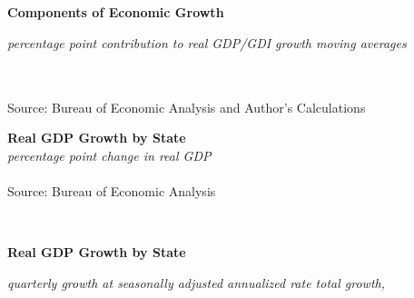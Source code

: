 \documentclass{report}
\begin{document}
\noindent \normalsize \textbf{Components of Economic Growth}\\
\footnotesize{\textit{percentage point contribution to real GDP/GDI growth \hspace{30mm} moving averages}\\ \vspace{4mm}
\hspace*{-2mm} \noindent {} \setlength{\tabcolsep}{3.5pt} \color{black!90}
		{\renewcommand{\arraystretch}{1.55}
		 \begin{tabular}{p{2mm} p{35.2mm} R{6.8mm} R{6.8mm} R{6.8mm} R{6.8mm} R{6.8mm} p{0mm} R{6.8mm} R{6.8mm} R{6.8mm} }

		\end{tabular}
		}	\\
\footnotesize{Source: Bureau of Economic Analysis and Author's Calculations}
		
\newpage

\noindent \normalsize \textbf{Real GDP Growth by State}\\
\footnotesize{\textit{percentage point change in real GDP}}\\
\vspace{-2mm}
\hspace{-8mm}  \\
\footnotesize{Source: Bureau of Economic Analysis}\\

\vspace{2mm}

\begin{minipage}{0.76\textwidth}

\small  \\

\end{minipage}

\vspace{2mm}

\noindent \normalsize \textbf{Real GDP Growth by State}\\
\footnotesize{\textit{quarterly growth at seasonally adjusted annualized rate \hspace{20mm} total growth, }\\ 

\vspace{-4.5mm}
\hspace{-2mm} \noindent {} \setlength{\tabcolsep}{3.8pt} \color{black!90}
		{\renewcommand{\arraystretch}{1.44}
		 \begin{tabular}{p{30mm} R{7mm} R{7mm} R{7mm} R{7mm} R{7mm} p{0mm} R{8mm} R{9mm} R{10mm} }
 \hline
		\end{tabular}
		}	\\

}}
\end{document}
